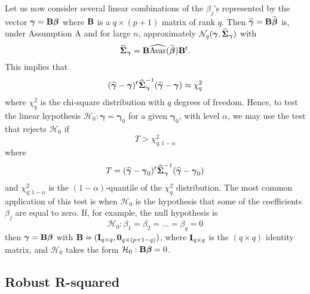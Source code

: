 Let us now consider several linear combinations of the $\beta_{j}$'s
represented by the vector $\boldsymbol{\gamma} = \mathbf B\boldsymbol\beta$
where $\mathbf B$ is a $q \times (p+1)$ matrix of rank $q$. Then
$\widehat{\boldsymbol{\gamma}} = \mathbf B\widehat{\boldsymbol\beta}$ is, under
Assumption A and for large $n$, approximately
$\mathcal{N}_q(\boldsymbol{\gamma},
\widehat{\boldsymbol\Sigma}_{\boldsymbol\gamma})$ with
\[
    \widehat{\boldsymbol\Sigma}_{\boldsymbol\gamma} 
    = \mathbf B\widehat{\mathrm{Avar}}(\widehat{\boldsymbol\beta})\mathbf B^t.
\]
This implies that
\[
    (\widehat{\boldsymbol\gamma} - \boldsymbol\gamma)^t 
    \widehat{\boldsymbol\Sigma}_{\boldsymbol\gamma}^{-1} 
    (\widehat{\boldsymbol\gamma} - \boldsymbol\gamma)  \approx \chi_q^2
\]
where $\chi_q^2$ is the chi-square distribution with $q$ degrees of freedom.
Hence, to test the linear hypothesis $\mathcal{H}_{0}: \boldsymbol\gamma =
\boldsymbol\gamma_0$ for a given $\boldsymbol\gamma_0$, with level $\alpha$, we
may use the test that rejects $\mathcal{H}_0$ if
\[
    T > \chi_{q;1-\alpha}^2
\]
where
\[
    T = (\widehat{\boldsymbol\gamma} - \boldsymbol\gamma_0)^t
    \widehat{\boldsymbol\Sigma}_{\boldsymbol\gamma}^{-1}
    (\widehat{\boldsymbol\gamma} - \boldsymbol\gamma_0)
\]
and $\chi_{q;1-\alpha}^2$ is the $(1-\alpha)$-quantile of the $\chi_q^2$
distribution. The most common application of this test is when $\mathcal{H}_0$
is the hypothesis that some of the coefficients $\beta_j$ are equal to zero.
If, for example, the null hypothesis is
\[
    \mathcal{H}_0: \beta_1 = \beta_2 = \dots = \beta_q = 0
\]
then $\boldsymbol\gamma = \mathbf B\boldsymbol\beta$ with $\mathbf B =
(\mathbf I_{q\times q}, \mathbf 0_{q\times(p+1-q)})$, where $\mathbf I_{q\times
q}$ is the $(q\times q)$ identity matrix, and $\mathcal{H}_0$ takes the form
$\mathcal{H}_0: \mathbf B\boldsymbol\beta = 0$.

\subsection{Robust R-squared}

